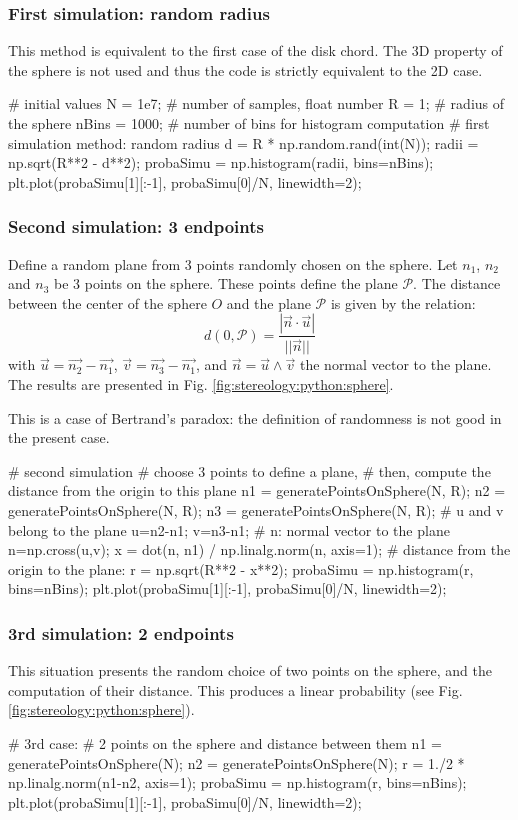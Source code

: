 \subsubsection{First simulation: random radius}

This method is equivalent to the first case of the disk chord. The 3D property of the sphere is not used and thus the code is strictly equivalent to the 2D case.

\begin{python}
# initial values	 
N = 1e7;      # number of samples, float number
R = 1;        # radius of the sphere
nBins = 1000; # number of bins for histogram computation
# first simulation method: random radius
d = R * np.random.rand(int(N));
radii = np.sqrt(R**2 - d**2);
probaSimu = np.histogram(radii, bins=nBins);
plt.plot(probaSimu[1][:-1], probaSimu[0]/N, linewidth=2);
\end{python}

\subsubsection{Second simulation: 3 endpoints}
Define a random plane from 3 points randomly chosen on the sphere. Let $n_1$, $n_2$ and $n_3$ be 3 points on the sphere. These points define the plane $\mathcal{P}$.
The distance between the center of the sphere $O$ and the plane $\mathcal{P}$ is given by the relation:
$$d(0, \mathcal{P})=\frac{|\vec{n}\cdot\vec{u}|}{||\vec{n}||}$$
with $\vec{u}=\vec{n_2}-\vec{n_1}$, $\vec{v}=\vec{n_3}-\vec{n_1}$, and $\vec{n}=\vec{u} \wedge\vec{v}$ the normal vector to the plane. The results are presented in Fig. \ref{fig:stereology:python:sphere}.

This is a case of Bertrand's paradox: the definition of randomness is not good in the present case.
\begin{python}
# second simulation
# choose 3 points to define a plane,
# then, compute the distance from the origin to this plane
n1 = generatePointsOnSphere(N, R);
n2 = generatePointsOnSphere(N, R);
n3 = generatePointsOnSphere(N, R);
# u and v belong to the plane
u=n2-n1;
v=n3-n1;
# n: normal vector to the plane
n=np.cross(u,v);
x = dot(n, n1) / np.linalg.norm(n, axis=1);
# distance from the origin to the plane:
r = np.sqrt(R**2 - x**2);
probaSimu = np.histogram(r, bins=nBins);
plt.plot(probaSimu[1][:-1], probaSimu[0]/N, linewidth=2);
\end{python}

\subsubsection{3rd simulation: 2 endpoints}
This situation presents the random choice of two points on the sphere, and the computation of their distance. This produces a linear probability (see Fig.\ref{fig:stereology:python:sphere}).
\begin{python}
# 3rd case: 
# 2 points on the sphere and distance between them
n1 = generatePointsOnSphere(N);
n2 = generatePointsOnSphere(N);
r = 1./2 * np.linalg.norm(n1-n2, axis=1);
probaSimu = np.histogram(r, bins=nBins);
plt.plot(probaSimu[1][:-1], probaSimu[0]/N, linewidth=2);
\end{python}

